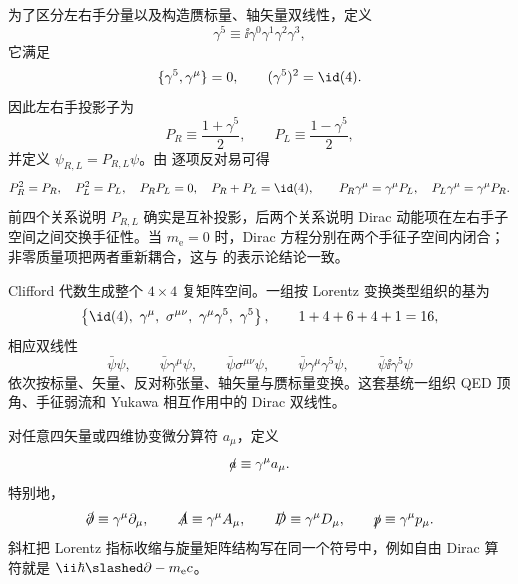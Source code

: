 为了区分左右手分量以及构造赝标量、轴矢量双线性，定义
\begin{equation}
 {\gamma^5\equiv \ii\gamma^0\gamma^1\gamma^2\gamma^3,}
 \label{eq:gamma5-def}
\end{equation}
它满足
\begin{equation}
 \{\gamma^5,\gamma^\mu\}=0,
 \qquad
 (\gamma^5)^2=\id(4).
 \label{eq:gamma5-anticomm}
\end{equation}
因此左右手投影子为
\begin{equation}
 {
 P_R\equiv\frac{1+\gamma^5}{2},
 \qquad
 P_L\equiv\frac{1-\gamma^5}{2},}
 \label{eq:chiral-projectors}
\end{equation}
并定义 $\psi_{R,L}=P_{R,L}\psi$。由 逐项反对易可得
\begin{equation}
 {
 P_R^2=P_R,\quad P_L^2=P_L,\quad P_RP_L=0,\quad P_R+P_L=\id(4),
 \qquad
 P_R\gamma^\mu=\gamma^\mu P_L,\quad
 P_L\gamma^\mu=\gamma^\mu P_R.}
 \label{eq:chiral-projector-algebra-dp68}
\end{equation}
前四个关系说明 $P_{R,L}$ 确实是互补投影，后两个关系说明 Dirac 动能项在左右手子空间之间交换手征性。当 $m_{\mathrm e}=0$ 时，Dirac 方程分别在两个手征子空间内闭合；非零质量项把两者重新耦合，这与
 的表示论结论一致。

Clifford 代数生成整个 $4\times4$ 复矩阵空间。一组按 Lorentz 变换类型组织的基为
\begin{equation}
 \left\{
 \id(4),\ \gamma^\mu,\ \sigma^{\mu\nu},\
 \gamma^\mu\gamma^5,\ \gamma^5
 \right\},
 \qquad 1+4+6+4+1=16,
 \label{eq:dirac-bilinear-basis}
\end{equation}
相应双线性
\begin{equation}
 \bar\psi\psi,\qquad
 \bar\psi\gamma^\mu\psi,\qquad
 \bar\psi\sigma^{\mu\nu}\psi,\qquad
 \bar\psi\gamma^\mu\gamma^5\psi,\qquad
 \bar\psi\ii\gamma^5\psi
 \label{eq:dirac-bilinears}
\end{equation}
依次按标量、矢量、反对称张量、轴矢量与赝标量变换。这套基统一组织 QED 顶角、手征弱流和 Yukawa 相互作用中的 Dirac 双线性。

对任意四矢量或四维协变微分算符 $a_\mu$，定义
\begin{equation*}
 {\slashed a\equiv\gamma^\mu a_\mu.}
\end{equation*}
特别地，
\begin{equation*}
 \slashed\partial\equiv\gamma^\mu\partial_\mu,
 \qquad
 \slashed A\equiv\gamma^\mu A_\mu,
 \qquad
 \slashed D\equiv\gamma^\mu D_\mu,
 \qquad
 \slashed p\equiv\gamma^\mu p_\mu.
\end{equation*}
斜杠把 Lorentz 指标收缩与旋量矩阵结构写在同一个符号中，例如自由 Dirac 算符就是 $\ii\hbar\slashed\partial-m_{\mathrm e} c$。

